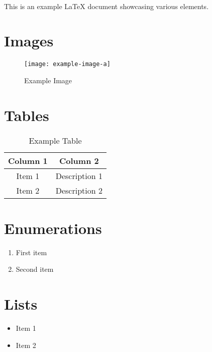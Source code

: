


\clearpage
\vspace*{-24pt}
\begin{center}
	{\textbf{\huge \theTitle \\}}
\end{center}



This is an example LaTeX document showcasing various elements.

\section{Images}
\begin{figure}[h]
	\centering
	\texttt{[image: example-image-a]}
	\caption{Example Image}
	\label{fig:example}
\end{figure}

\section{Tables}
\begin{table}[h]
	\centering
	\begin{tabular}{|c|c|}
		\hline
		Column 1 & Column 2      \\
		\hline
		Item 1   & Description 1 \\
		Item 2   & Description 2 \\
		\hline
	\end{tabular}
	\caption{Example Table}
	\label{tab:example}
\end{table}

\section{Enumerations}
\begin{enumerate}
	\item First item
	\item Second item
\end{enumerate}

\section{Lists}
\begin{itemize}
	\item Item 1
	\item Item 2
\end{itemize}

